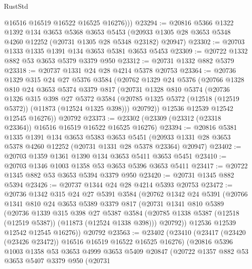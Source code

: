 \begin{lexlean}{RustStd}
\begin{coremodule}
          @16516
          @16519
          @16522
          @16525
          @16276)))
@23294 := @20816
    @5366
    @1322
    @1392
    @134
    @3653
    @5368
    @3653
    @5453
    (@20933 @1305 @28 @3653 @5348 @4260 @12252 (@20731 @1305 @28 @5348 @23182) @20947)
@23302 := @20703 @1333 @1335 @1391 @134 @3653 @5381 @3653 @5453
@23309 := @20722 @1332 @882 @53 @3653 @5379 @3379 @950
@23312 := @20731 @1332 @882 @5379
@23318 := @20737 @1331 @24 @28 @4214 @5378 @20753
@23364 := @20736
    @1329
    @315
    @24
    @27
    @5376
    @3584
    (@20762
      @1329
      @24
      @5376
      (@20766
        @1328
        @810
        @24
        @3653
        @5374
        @3379
        @817
        (@20731
          @1328
          @810
          @5374
          (@20736
            @1326
            @315
            @398
            @27
            @5372
            @3584
            (@20785 @1325 @5372 (@12518 (@12519 @5372)) (@11873 (@12524 @1325 @398)))
            @20792))
        @12536
        @12539
        @12542
        @12545
        @16276))
    @20792
@23373 := @23302 (@23309 (@23312 (@23318 @23364)) @16516 @16519 @16522 @16525 @16276)
@23394 := @20816
    @5381
    @1335
    @1391
    @134
    @3653
    @5383
    @3653
    @5451
    (@20933 @1331 @28 @3653 @5378 @4260 @12252 (@20731 @1331 @28 @5378 @23364) @20947)
@23402 := @20703 @1359 @1361 @1390 @134 @3653 @5411 @3653 @5451
@23410 := @20703 @1346 @1003 @1358 @53 @3653 @5396 @3653 @5411
@23417 := @20722 @1345 @882 @53 @3653 @5394 @3379 @950
@23420 := @20731 @1345 @882 @5394
@23426 := @20737 @1344 @24 @28 @4214 @5393 @20753
@23472 := @20736
    @1342
    @315
    @24
    @27
    @5391
    @3584
    (@20762
      @1342
      @24
      @5391
      (@20766
        @1341
        @810
        @24
        @3653
        @5389
        @3379
        @817
        (@20731
          @1341
          @810
          @5389
          (@20736
            @1339
            @315
            @398
            @27
            @5387
            @3584
            (@20785 @1338 @5387 (@12518 (@12519 @5387)) (@11873 (@12524 @1338 @398)))
            @20792))
        @12536
        @12539
        @12542
        @12545
        @16276))
    @20792
@23563 := @23402
    (@23410
      (@23417 (@23420 (@23426 @23472)) @16516 @16519 @16522 @16525 @16276)
      (@20816
        @5396
        @1003
        @1358
        @53
        @3653
        @4999
        @3653
        @5409
        @20847
        (@20722
          @1357
          @882
          @53
          @3653
          @5407
          @3379
          @950
          (@20731

\end{coremodule}
\end{lexlean}
